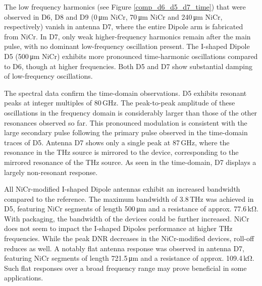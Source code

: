 The low frequency harmonics (see Figure \ref{comp_d6_d5_d7_time}) that were observed in D6, D8 and D9 (\num{0}\,\si{\micro \meter} NiCr, \num{70}\,\si{\micro \meter} NiCr and \num{240}\,\si{\micro \meter} NiCr, respectively) vanish in antenna D7, where the entire Dipole arm is fabricated from NiCr. In D7, only weak higher-frequency harmonics remain after the main pulse, with no dominant low-frequency oscillation present. The I-shaped Dipole D5 (\num{500}\,\si{\micro \meter} NiCr) exhibits more pronounced time-harmonic oscillations compared to D6, though at higher frequencies. Both D5 and D7 show substantial damping of low-frequency oscillations.

The spectral data confirm the time-domain observations. D5 exhibits resonant peaks at integer multiples of \num{80}\,\si{\giga \hertz}. The peak-to-peak amplitude of these oscillations in the frequency domain is considerably larger than those of the other resonances observed so far. This pronounced modulation is consistent with the large secondary pulse following the primary pulse observed in the time-domain traces of D5. Antenna D7 shows only a single peak at \num{87}\,\si{\giga \hertz}, where the resonance in the THz source is mirrored to the device, corresponding to the mirrored resonance of the THz source. As seen in the time-domain, D7 displays a largely non-resonant response.

All NiCr-modified I-shaped Dipole antennas exhibit an increased bandwidth compared to the reference. The maximum bandwidth of \num{3.8}\,\si{\tera \hertz} was achieved in D5, featuring NiCr segments of length \num{500}\,\si{\micro \meter} and a resistance of approx. \num{77.6}\,\si{\kilo \ohm}. With packaging, the bandwidth of the devices could be further increased. NiCr does not seem to impact the I-shaped Dipoles performance at higher THz frequencies. While the peak DNR decreases in the NiCr-modified devices, roll-off reduces as well. A notably flat antenna response was observed in antenna D7, featuring NiCr segments of length \num{721.5}\,\si{\micro \meter} and a resistance of approx. \num{109.4}\,\si{\kilo \ohm}. Such flat responses over a broad frequency range may prove beneficial in some applications. 


